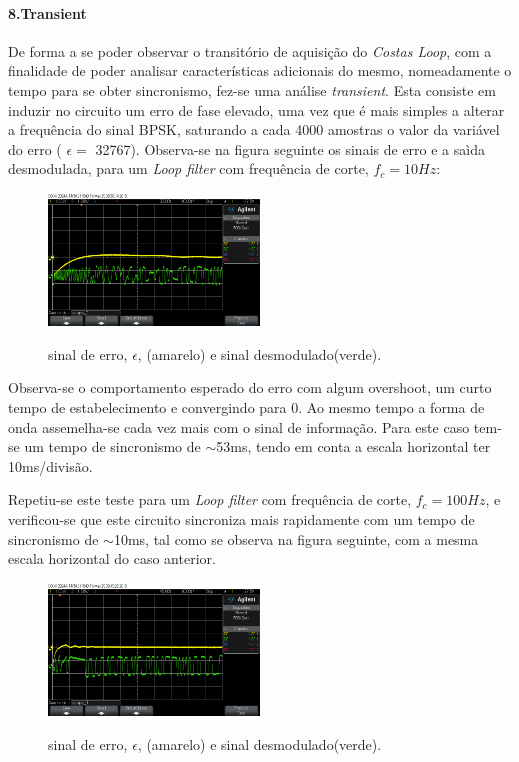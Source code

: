\documentclass[11pt]{article}
\numberwithin{equation}{section}
\begin{document}
\paragraph{8.Transient} \hspace{0pt} \label{para:P3-8}

De forma a se poder observar o transitório de aquisição do \textit{Costas Loop}, com a finalidade de poder analisar características adicionais do mesmo, nomeadamente o tempo para se obter sincronismo, fez-se uma análise \textit{transient}. Esta consiste em induzir no circuito um erro de fase elevado, uma vez que é mais simples a alterar a frequência do sinal BPSK, saturando a cada 4000 amostras o valor da variável do erro ( $\epsilon=$ 32767). Observa-se na figura seguinte os sinais de erro e a saìda desmodulada, para um \textit{Loop filter} com frequência de corte, $f_c = 10Hz$:

\begin{figure}[H]
	\centering
	\includegraphics[width=0.5\textwidth]{./transient10Hz}~\\
	\caption{sinal de erro, $\epsilon$, (amarelo) e sinal desmodulado(verde).}
	\label{trans10}
\end{figure}
Observa-se o comportamento esperado do erro com algum overshoot, um curto tempo de estabelecimento e convergindo para 0. Ao mesmo tempo a forma de onda assemelha-se cada vez mais com o sinal de informação. Para este caso tem-se um tempo de sincronismo de $\sim$53ms, tendo em conta a escala horizontal ter 10ms/divisão.

Repetiu-se este teste para um \textit{Loop filter} com frequência de corte, $f_c = 100Hz$, e verificou-se que este circuito sincroniza mais rapidamente com um tempo de sincronismo de $\sim$10ms, tal como se observa na figura seguinte, com a mesma escala horizontal do caso anterior.

\begin{figure}[H]
	\centering
	\includegraphics[width=0.5\textwidth]{./transient100Hz}~\\
	\caption{sinal de erro, $\epsilon$, (amarelo) e sinal desmodulado(verde).}
	\label{trans100}
\end{figure}
\end{document}
